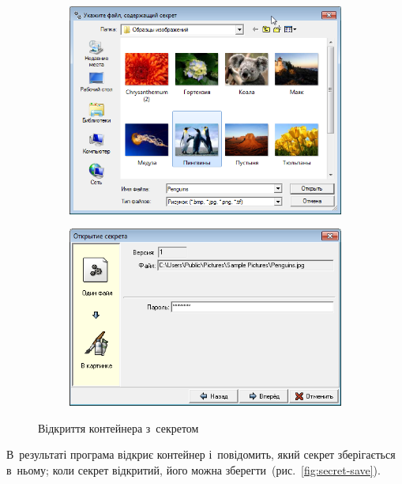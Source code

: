 \documentclass[
	a4paper,
	oneside,
	BCOR = 10mm,
	DIV = 12,
	12pt,
	headings = normal,
]{scrartcl}
\newlength{\gridunitwidth}
\begin{document}
		\begin{figure}[!htbp]
			\begin{subfigure}[b]{6 \gridunitwidth - 1em / (2-1)}
				\includegraphics[width = \columnwidth]{./assets/p10.png}
				\caption{}
				\label{subfig:secret-open-select}
			\end{subfigure}%
			\hspace{1em}%
			\begin{subfigure}[b]{6 \gridunitwidth - 1em / (2-1)}
				\includegraphics[width = \columnwidth]{./assets/p12.png}
				\caption{}
				\label{subfig:secret-open-pass}
			\end{subfigure}
			\caption{Відкриття контейнера з~секретом}
			\label{fig:secret-open}
		\end{figure}

		В~результаті програма відкриє контейнер і~повідомить, який секрет зберігається в~ньому; коли секрет відкритий, його можна зберегти~(рис.~\ref{fig:secret-save}).
\end{document}
